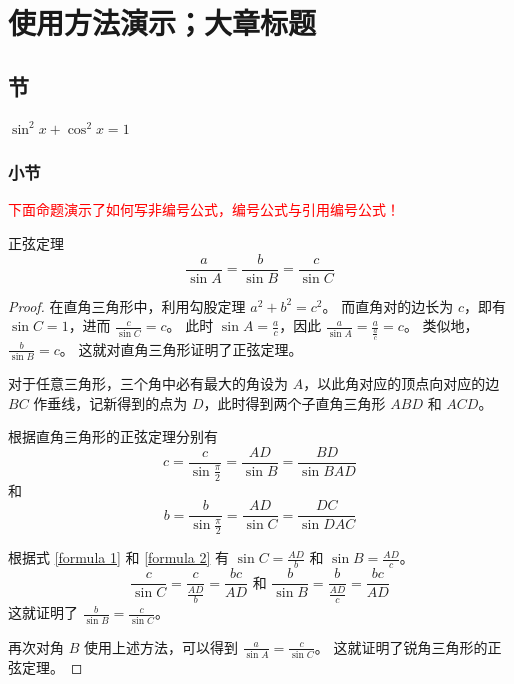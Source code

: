 \chapter{使用方法演示；大章标题}

\section{节}

\begin{axiom}
    $\sin^2 x + \cos^2 x = 1$
\end{axiom}

\subsection{小节}

\textcolor{red}{下面命题演示了如何写非编号公式，编号公式与引用编号公式！}
\begin{proposition} 正弦定理
    \[
        \frac{a}{\sin A} = \frac{b}{\sin B} = \frac{c}{\sin C}
    \]

    \begin{proof}
        在直角三角形中，利用勾股定理 $a^2 + b^2 = c^2$。
        而直角对的边长为 $c$，即有 $\sin C = 1$，进而 $\frac{c}{\sin C} = c$。
        此时 $\sin A = \frac{a}{c}$，因此 $\frac{a}{\sin A} = \frac{a}{\frac{a}{c}} = c$。
        类似地，$\frac{b}{\sin B} = c$。
        这就对直角三角形证明了正弦定理。

        对于任意三角形，三个角中必有最大的角设为 $A$，以此角对应的顶点向对应的边 $BC$ 作垂线，记新得到的点为 $D$，此时得到两个子直角三角形 $ABD$ 和 $ACD$。
        
        根据直角三角形的正弦定理分别有
        \begin{equation}\label{formula 1}
            c = \frac{c}{\sin \frac{\pi}{2}} = \frac{AD}{\sin B} = \frac{BD}{\sin BAD}
        \end{equation}
        和
        \begin{equation}\label{formula 2}
            b = \frac{b}{\sin \frac{\pi}{2}} = \frac{AD}{\sin C} = \frac{DC}{\sin DAC}
        \end{equation}
        
        根据式 \ref{formula 1} 和 \ref{formula 2} 有 $\sin C = \frac{AD}{b}$ 和 $\sin B = \frac{AD}{c}$。
        \[
            \frac{c}{\sin C} = \frac{c}{\frac{AD}{b}} = \frac{bc}{AD}
            \text{ 和 }
            \frac{b}{\sin B} = \frac{b}{\frac{AD}{c}} = \frac{bc}{AD}
        \]
        这就证明了 $\frac{b}{\sin B} = \frac{c}{\sin C}$。

        再次对角 $B$ 使用上述方法，可以得到 $\frac{a}{\sin A} = \frac{c}{\sin C}$。
        这就证明了锐角三角形的正弦定理。
    \end{proof}
\end{proposition}


